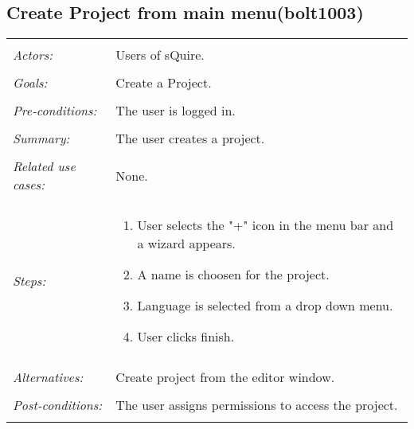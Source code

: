 

\subsection{Create Project from main menu(bolt1003)}
\begin{tabular}{ p{2cm} p{12cm} }
 \hline
 \\
 \textit{Actors:} & Users of sQuire. \\ 
 \\
 \textit{Goals:} & Create a Project. \\
 \\
 \textit{Pre-conditions:} & The user is logged in. \\
 \\
 \textit{Summary:} & The user creates a project. \\ 
 \\
 \textit{Related use cases:} & None. \\ 
 \\
 \textit{Steps:} & \begin{enumerate}
  \item User selects the "+" icon in the menu bar and a wizard appears.
  \item A name is choosen for the project.
  \item Language is selected from a drop down menu.
  \item User clicks finish.
 \end{enumerate} \\
 \\
 \textit{Alternatives:} & Create project from the editor window. \\
 \\
 \textit{Post-conditions:} & The user assigns permissions to access the project. \\
 \\
\hline
\end{tabular}


